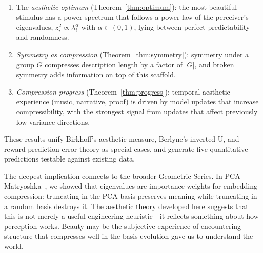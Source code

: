 \documentclass[journal]{IEEEtran}
\begin{document}
\begin{enumerate}
    \item The \emph{aesthetic optimum} (Theorem~\ref{thm:optimum}):
    the most beautiful stimulus has a power spectrum that follows a
    power law of the perceiver's eigenvalues, $z_i^2 \propto
    \lambda_i^\alpha$ with $\alpha \in (0,1)$, lying between perfect
    predictability and randomness.

    \item \emph{Symmetry as compression}
    (Theorem~\ref{thm:symmetry}): symmetry under a group $G$ compresses
    description length by a factor of $|G|$, and broken symmetry adds
    information on top of this scaffold.

    \item \emph{Compression progress}
    (Theorem~\ref{thm:progress}): temporal aesthetic experience
    (music, narrative, proof) is driven by model updates that increase
    compressibility, with the strongest signal from updates that
    affect previously low-variance directions.
\end{enumerate}

These results unify Birkhoff's aesthetic measure, Berlyne's inverted-U,
and reward prediction error theory as special cases, and generate five
quantitative predictions testable against existing data.

The deepest implication connects to the broader Geometric Series.
In PCA-Matryoshka~\cite{bond2026pcamatryoshka}, we showed that
eigenvalues are importance weights for embedding compression: truncating
in the PCA basis preserves meaning while truncating in a random basis
destroys it.  The aesthetic theory developed here suggests that this is
not merely a useful engineering heuristic---it reflects something about
how perception works.  Beauty may be the subjective experience of
encountering structure that compresses well in the basis evolution gave
us to understand the world.
\end{document}
